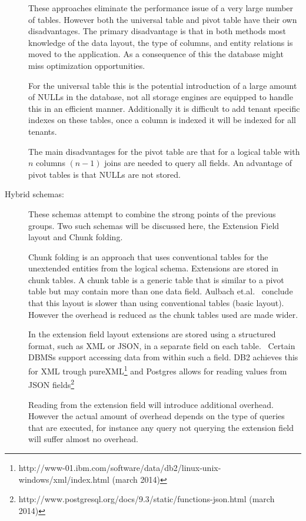 \begin{description}
		These approaches eliminate the performance issue of a very large number of tables.
		However both the universal table and pivot table have their own disadvantages. 
		The primary disadvantage is that in both methods most knowledge of the data layout, the type of columns, and entity relations is moved to the application.
		As a consequence of this the database might miss optimization opportunities.~\cite{schiller2011native}

		For the universal table this is the potential introduction of a large amount of NULLs in the database, not all storage engines are equipped to handle this in an efficient manner. 
		Additionally it is difficult to add tenant specific indexes on these tables, once a column is indexed it will be indexed for all tenants.

		The main disadvantages for the pivot table are that for a logical table with $n$ columns $(n-1)$ joins are needed to query all fields. 
		An advantage of pivot tables is that NULLs are not stored.
	\item[Hybrid schemas: ] These schemas attempt to combine the strong points of the previous groups. 
		Two such schemas will be discussed here, the Extension Field layout and Chunk folding.

		Chunk folding is an approach that uses conventional tables for the unextended entities from the logical schema.
		Extensions are stored in chunk tables. A chunk table is a generic table that is similar to a pivot table but may contain more than one data field.
		Aulbach et.al.~\cite{aulbach2008multi} conclude that this layout is slower than using conventional tables (basic layout). 
		However the overhead is reduced as the chunk tables used are made wider. 

		In the extension field layout extensions are stored using a structured format, such as XML or JSON, in a separate field on each table.~\cite{aulbach2009comparison}
		Certain \acp{DBMS} support accessing data from within such a field. DB2 achieves this for XML trough pureXML\footnote{http://www-01.ibm.com/software/data/db2/linux-unix-windows/xml/index.html (march 2014)} and Postgres allows for reading values from JSON fields\footnote{http://www.postgresql.org/docs/9.3/static/functions-json.html (march 2014)}
		
		Reading from the extension field will introduce additional overhead. However the actual amount of overhead depends on the type of queries that are executed, for instance any query not querying the extension field will suffer almost no overhead.~\cite{aulbach2009comparison}
\end{description}

